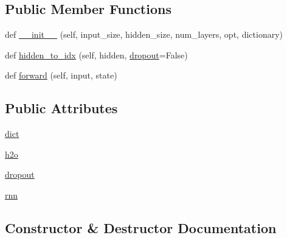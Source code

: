 \subsection*{Public Member Functions}
\begin{DoxyCompactItemize}
\item 
def \hyperlink{classprojects_1_1memnn__feedback_1_1agent_1_1modules_1_1Decoder_a20c4d7bd66706996d3b34d7cbc68e2ec}{\+\_\+\+\_\+init\+\_\+\+\_\+} (self, input\+\_\+size, hidden\+\_\+size, num\+\_\+layers, opt, dictionary)
\item 
def \hyperlink{classprojects_1_1memnn__feedback_1_1agent_1_1modules_1_1Decoder_a3f1f3b7a66bff23cd1923ff739c42456}{hidden\+\_\+to\+\_\+idx} (self, hidden, \hyperlink{classprojects_1_1memnn__feedback_1_1agent_1_1modules_1_1Decoder_a1f90b65a911c97661bc4b9c0e6d0d74e}{dropout}=False)
\item 
def \hyperlink{classprojects_1_1memnn__feedback_1_1agent_1_1modules_1_1Decoder_afea4d72e2b956ae9c2f896a6f2bf2ff2}{forward} (self, input, state)
\end{DoxyCompactItemize}
\subsection*{Public Attributes}
\begin{DoxyCompactItemize}
\item 
\hyperlink{classprojects_1_1memnn__feedback_1_1agent_1_1modules_1_1Decoder_a26b383c0d9f0e2088f5a1731683e5d7e}{dict}
\item 
\hyperlink{classprojects_1_1memnn__feedback_1_1agent_1_1modules_1_1Decoder_a2944c1214ef4b408e0c0e7b2387a2fee}{h2o}
\item 
\hyperlink{classprojects_1_1memnn__feedback_1_1agent_1_1modules_1_1Decoder_a1f90b65a911c97661bc4b9c0e6d0d74e}{dropout}
\item 
\hyperlink{classprojects_1_1memnn__feedback_1_1agent_1_1modules_1_1Decoder_a7cd6616d295ec8fc3ab0c837e651f402}{rnn}
\end{DoxyCompactItemize}


\subsection{Constructor \& Destructor Documentation}
\mbox{\label{classprojects_1_1memnn__feedback_1_1agent_1_1modules_1_1Decoder_a20c4d7bd66706996d3b34d7cbc68e2ec}} 
